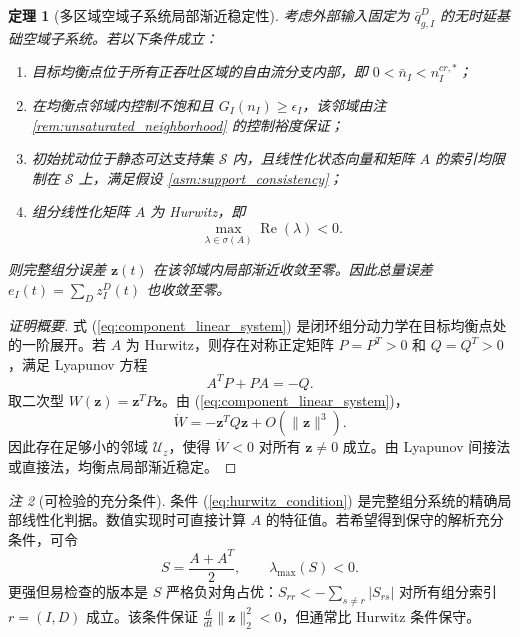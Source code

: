 \documentclass[a4paper,12pt]{article}
\theoremstyle{plain}
\newtheorem{theorem}{定理}[section]
\theoremstyle{definition}
\theoremstyle{remark}
\newtheorem{remark}[theorem]{注}
\begin{document}
\begin{theorem}[多区域空域子系统局部渐近稳定性]\label{thm:multi_region_stability}
考虑外部输入固定为 $\bar q_{g,I}^D$ 的无时延基础空域子系统。若以下条件成立：
\begin{enumerate}
    \item 目标均衡点位于所有正吞吐区域的自由流分支内部，即 $0<\bar n_I<n_I^{cr,*}$；
    \item 在均衡点邻域内控制不饱和且 $G_I(n_I)\ge\epsilon_I$，该邻域由注 \ref{rem:unsaturated_neighborhood} 的控制裕度保证；
    \item 初始扰动位于静态可达支持集 $\mathcal S$ 内，且线性化状态向量和矩阵 $A$ 的索引均限制在 $\mathcal S$ 上，满足假设 \ref{asm:support_consistency}；
    \item 组分线性化矩阵 $A$ 为 Hurwitz，即
    \begin{equation}\label{eq:hurwitz_condition}
        \max_{\lambda\in\sigma(A)}\operatorname{Re}(\lambda)<0 .
    \end{equation}
\end{enumerate}
则完整组分误差 $\bm z(t)$ 在该邻域内局部渐近收敛至零。因此总量误差 $e_I(t)=\sum_D z_I^D(t)$ 也收敛至零。
\end{theorem}

\begin{proof}[证明概要]
式 (\ref{eq:component_linear_system}) 是闭环组分动力学在目标均衡点处的一阶展开。若 $A$ 为 Hurwitz，则存在对称正定矩阵 $P=P^T>0$ 和 $Q=Q^T>0$，满足 Lyapunov 方程
\begin{equation}\label{eq:component_lyapunov}
    A^T P+PA=-Q .
\end{equation}
取二次型 $W(\bm z)=\bm z^T P\bm z$。由 (\ref{eq:component_linear_system})，
\begin{equation}
    \dot W
    =
    -\bm z^T Q\bm z+O(\|\bm z\|^3).
\end{equation}
因此存在足够小的邻域 $\mathcal U_z$，使得 $\dot W<0$ 对所有 $\bm z\ne0$ 成立。由 Lyapunov 间接法或直接法，均衡点局部渐近稳定。
\end{proof}

\begin{remark}[可检验的充分条件]\label{rem:diagonal_dominance}
条件 (\ref{eq:hurwitz_condition}) 是完整组分系统的精确局部线性化判据。数值实现时可直接计算 $A$ 的特征值。若希望得到保守的解析充分条件，可令
\begin{equation}\label{eq:symmetrized_condition}
    S=\frac{A+A^T}{2},\qquad \lambda_{\max}(S)<0 .
\end{equation}
更强但易检查的版本是 $S$ 严格负对角占优：$S_{rr}<-\sum_{s\ne r}|S_{rs}|$ 对所有组分索引 $r=(I,D)$ 成立。该条件保证 $\frac{d}{dt}\|\bm z\|_2^2<0$，但通常比 Hurwitz 条件保守。
\end{remark}
\end{document}
